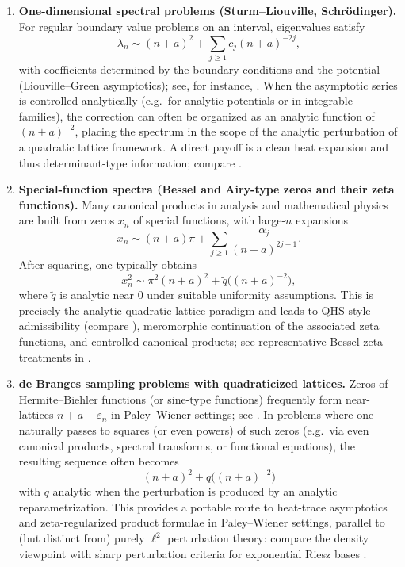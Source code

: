 \documentclass[11pt,letterpaper]{amsart}
\numberwithin{equation}{section}
\theoremstyle{definition}
\begin{document}
\begin{enumerate}[label=\textup{(\arabic*)},leftmargin=2.6em]
\item \textbf{One-dimensional spectral problems (Sturm--Liouville, Schr\"odinger).}
For regular boundary value problems on an interval, eigenvalues satisfy
\[
\lambda_n \sim (n+a)^2 + \sum_{j\ge1}c_j(n+a)^{-2j},
\]
with coefficients determined by the boundary conditions and the potential (Liouville--Green asymptotics); see, for instance,
\cite{Zettl2005_SturmLiouvilleTheory,LevitanSargsjan1991_SLDirac,PoschelTrubowitz1987_InverseSpectralTheory}.
When the asymptotic series is controlled analytically (e.g.\ for analytic potentials or
in integrable families), the correction can often be organized as an analytic function of $(n+a)^{-2}$,
placing the spectrum in the scope of the analytic perturbation of a quadratic lattice framework.
A direct payoff is a clean heat expansion and thus determinant-type information; compare \cite{GelfandYaglom1960_FunctionalSpacesDet,BFK1995_LineSegmentDet,KirstenMcKane2004_DeterminantsSL}.

\item \textbf{Special-function spectra (Bessel and Airy-type zeros and their zeta functions).}
Many canonical products in analysis and mathematical physics are built from zeros $x_{n}$ of special
functions, with large-$n$ expansions
\[
x_n \sim (n+a)\pi + \sum_{j\ge1}\frac{\alpha_j}{(n+a)^{2j-1}}.
\]
After squaring, one typically obtains
\[
x_n^2 \sim \pi^2 (n+a)^2 + \widetilde q\bigl((n+a)^{-2}\bigr),
\]
where $\widetilde q$ is analytic near $0$ under suitable uniformity assumptions.
This is precisely the analytic-quadratic-lattice paradigm and leads to QHS-style admissibility
(compare \cite{QHS,Seeley67}), meromorphic continuation of the associated zeta functions, and controlled canonical products; see representative Bessel-zeta treatments in
\cite{ActorBender1996_BesselZerosZeta,Spreafico2004_BesselZeta,NaberBruckCostello2022_BesselZeta,AldanaKirstenRowlett2025_VariationBarnesBessel}.

\item \textbf{de Branges sampling problems with quadraticized lattices.}
Zeros of Hermite--Biehler functions (or sine-type functions) frequently form near-lattices
$n+a+\varepsilon_n$ in Paley--Wiener settings; see \cite{deBranges68,Seip2004_InterpolationSampling}.
In problems where one naturally passes to squares (or even powers) of such zeros
(e.g.\ via even canonical products, spectral transforms, or functional equations), the resulting
sequence often becomes
\[
(n+a)^2 + q\bigl((n+a)^{-2}\bigr)
\]
with $q$ analytic when the perturbation is produced by an analytic reparametrization.
This provides a portable route to heat-trace asymptotics and zeta-regularized product formulae in
Paley--Wiener settings, parallel to (but distinct from) purely $\ell^2$ perturbation theory:
compare the density viewpoint
\cite{Landau1967_Density,OrtegaCerdaSeip2002_FourierFrames,MarzoNitzanOlsen2012_DoublingPhase}
with sharp perturbation criteria for exponential Riesz bases
\cite{Kadec1964_PaleyWienerConstant,Avdonin1974_RieszBases,Pavlov1979_BasicityMuckenhoupt}.
\end{enumerate}
\end{document}
